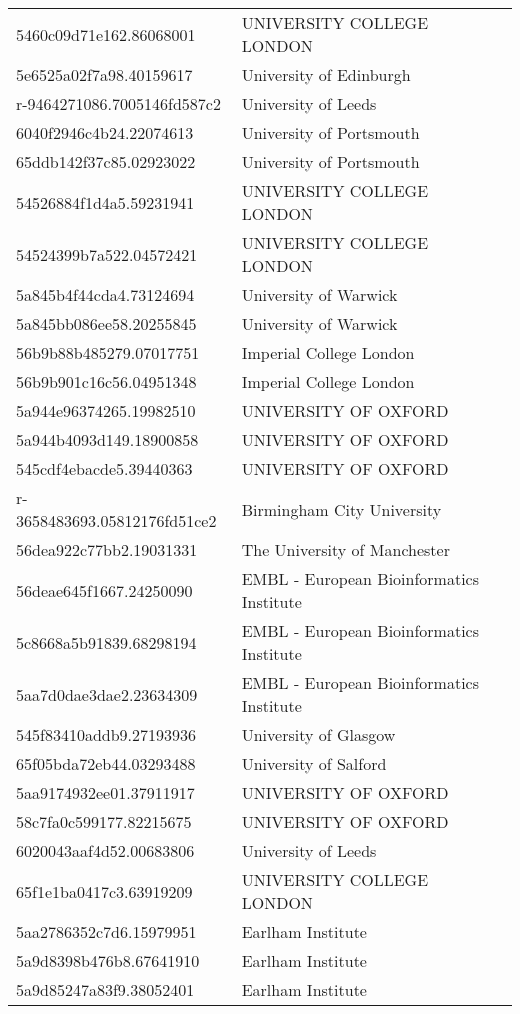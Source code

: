 \begin{tabular}{ll}
5460c09d71e162.86068001 & UNIVERSITY COLLEGE LONDON \\
5e6525a02f7a98.40159617 & University of Edinburgh \\
r-9464271086.7005146fd587c2 & University of Leeds \\
6040f2946c4b24.22074613 & University of Portsmouth \\
65ddb142f37c85.02923022 & University of Portsmouth \\
54526884f1d4a5.59231941 & UNIVERSITY COLLEGE LONDON \\
54524399b7a522.04572421 & UNIVERSITY COLLEGE LONDON \\
5a845b4f44cda4.73124694 & University of Warwick \\
5a845bb086ee58.20255845 & University of Warwick \\
56b9b88b485279.07017751 & Imperial College London \\
56b9b901c16c56.04951348 & Imperial College London \\
5a944e96374265.19982510 & UNIVERSITY OF OXFORD \\
5a944b4093d149.18900858 & UNIVERSITY OF OXFORD \\
545cdf4ebacde5.39440363 & UNIVERSITY OF OXFORD \\
r-3658483693.05812176fd51ce2 & Birmingham City University \\
56dea922c77bb2.19031331 & The University of Manchester \\
56deae645f1667.24250090 & EMBL - European Bioinformatics Institute \\
5c8668a5b91839.68298194 & EMBL - European Bioinformatics Institute \\
5aa7d0dae3dae2.23634309 & EMBL - European Bioinformatics Institute \\
545f83410addb9.27193936 & University of Glasgow \\
65f05bda72eb44.03293488 & University of Salford \\
5aa9174932ee01.37911917 & UNIVERSITY OF OXFORD \\
58c7fa0c599177.82215675 & UNIVERSITY OF OXFORD \\
6020043aaf4d52.00683806 & University of Leeds \\
65f1e1ba0417c3.63919209 & UNIVERSITY COLLEGE LONDON \\
5aa2786352c7d6.15979951 & Earlham Institute \\
5a9d8398b476b8.67641910 & Earlham Institute \\
5a9d85247a83f9.38052401 & Earlham Institute \\

\end{tabular}
